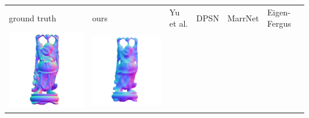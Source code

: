 \begin{tabularx}{\linewidth}{@{}Y@{}Y@{}Y@{}Y@{}Y@{}Y@{}}
ground truth & ours & Yu et al. & DPSN & MarrNet & Eigen-Fergus \\
\includegraphics[width=\linewidth]{semisynthetic/20160617_20_gt.png} &
\includegraphics[width=\linewidth]{semisynthetic/20160617_20_ours_out.png} &

\end{tabularx}
